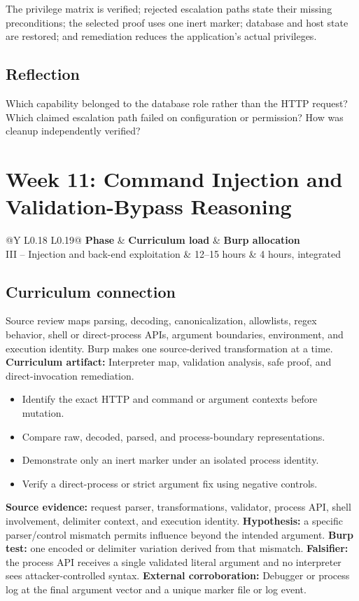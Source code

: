 \documentclass[11pt]{article}
\makeatletter
\newcommand{\weekheader}[5]{%
  \clearpage
  \section{Week #1: #2}
  \begin{tcolorbox}[colback=Navy,colframe=Navy,coltext=white]
    \begin{tabularx}{\linewidth}{@{}Y L{0.18\linewidth} L{0.19\linewidth}@{}}
      \textbf{Phase} & \textbf{Curriculum load} & \textbf{Burp allocation}\\
      #3 & #4 hours & #5 hours, integrated
    \end{tabularx}
  \end{tcolorbox}
}
\newcommand{\weekfield}[2]{%
  \Needspace{5\baselineskip}
  \subsection*{#1}
  #2
}
\newcommand{\curriculumartifact}[1]{\textbf{Curriculum artifact:} #1}
\newcommand{\externalproof}[1]{\textbf{External corroboration:} #1}
\makeatother
\begin{document}
\begin{checkpoints}
The privilege matrix is verified; rejected escalation paths state their missing
preconditions; the selected proof uses one inert marker; database and host state
are restored; and remediation reduces the application's actual privileges.
\end{checkpoints}

\weekfield{Reflection}{Which capability belonged to the database role rather
than the HTTP request? Which claimed escalation path failed on configuration or
permission? How was cleanup independently verified?}

\weekheader{11}{Command Injection and Validation-Bypass Reasoning}{III -- Injection and back-end exploitation}{12--15}{4}

\weekfield{Curriculum connection}{Source review maps parsing, decoding,
canonicalization, allowlists, regex behavior, shell or direct-process APIs,
argument boundaries, environment, and execution identity. Burp makes one
source-derived transformation at a time. \curriculumartifact{Interpreter map,
validation analysis, safe proof, and direct-invocation remediation.}}

\begin{objectivebox}
\begin{itemize}
  \item Identify the exact HTTP and command or argument contexts before mutation.
  \item Compare raw, decoded, parsed, and process-boundary representations.
  \item Demonstrate only an inert marker under an isolated process identity.
  \item Verify a direct-process or strict argument fix using negative controls.
\end{itemize}
\end{objectivebox}

\begin{bridgebox}
\textbf{Source evidence:} request parser, transformations, validator, process API,
shell involvement, delimiter context, and execution identity. \textbf{Hypothesis:}
a specific parser/control mismatch permits influence beyond the intended argument.
\textbf{Burp test:} one encoded or delimiter variation derived from that mismatch.
\textbf{Falsifier:} the process API receives a single validated literal argument
and no interpreter sees attacker-controlled syntax. \externalproof{Debugger or
process log at the final argument vector and a unique marker file or log event.}
\end{bridgebox}
\end{document}
